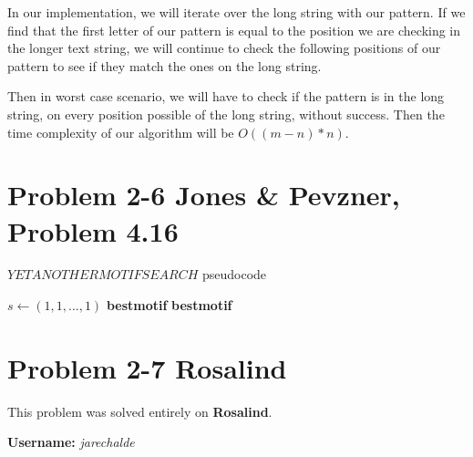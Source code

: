 \documentclass{article}
\begin{document}
In our implementation, we will iterate over the long string with our pattern. If we find that the first letter of our pattern is equal to the position we are checking in the longer text string, we will continue to check the following positions of our pattern to see if they match the ones on the long string. 

Then in worst case scenario, we will have to check if the pattern is in the long string, on every position possible of the long string, without success. Then the time complexity of our algorithm will be $O((m-n)*n)$.

\section*{Problem 2-6 Jones \& Pevzner, Problem 4.16}

\begin{algorithm}[H]
\caption{$YETANOTHERMOTIFSEARCH$ pseudocode}
\begin{algorithmic}[1]
\State $s \gets (1,1,\dots,1)$
\State \textbf{bestmotif} \gets {}
\State \Return \textbf{bestmotif}
\EndFunction
\end{algorithmic}
\end{algorithm}

\section*{Problem 2-7 Rosalind}

This problem was solved entirely on \textbf{Rosalind}.

\textbf{Username:} \textit{jarechalde}
\end{document}
